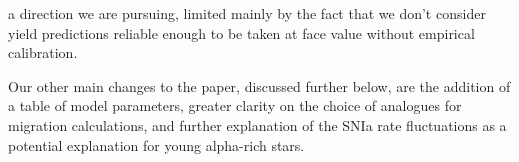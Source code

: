 \documentclass{report}
\begin{document}
a direction we are pursuing, limited mainly by the fact that we don't consider 
yield predictions reliable enough to be taken at face value without empirical 
calibration. 
\par 
Our other main changes to the paper, discussed further below, are 
the addition of a table of model parameters, greater clarity on the 
choice of analogues for migration calculations, and further explanation 
of the SNIa rate fluctuations as a potential explanation for young 
alpha-rich stars. 
\end{document}
